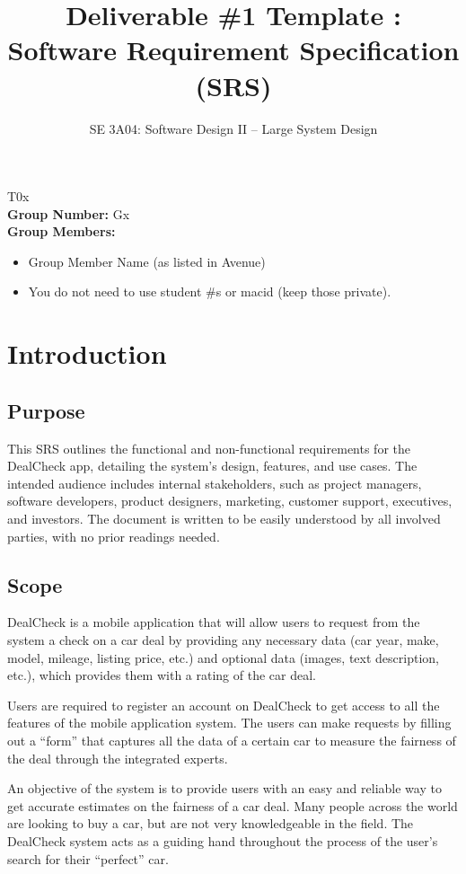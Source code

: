 \documentclass[]{article}
\title{Deliverable \#1 Template : Software Requirement Specification (SRS)}
\author{SE 3A04: Software Design II -- Large System Design}
\date{}
\begin{document}
\maketitle	
{} T0x\\
{\bf Group Number:} Gx \\
{\bf Group Members:} 
\begin{itemize}
    \item Group Member Name (as listed in Avenue)
    \item You do not need to use student \#s or macid (keep those private).
\end{itemize}

\newpage
\section{Introduction}
\label{sec:introduction}

\subsection{Purpose}
\label{sub:purpose}
This SRS outlines the functional and non-functional requirements for the DealCheck app, detailing the system's design, features, and use cases. The intended audience includes internal stakeholders, such as project managers, software developers, product designers, marketing, customer support, executives, and investors. The document is written to be easily understood by all involved parties, with no prior readings needed.

\subsection{Scope}
\label{sub:scope}
DealCheck is a mobile application that will allow users to request from the system a check on a car deal by providing any necessary data (car year, make, model, mileage, listing price, etc.) and optional data (images, text description, etc.), which provides them with a rating of the car deal. 

Users are required to register an account on DealCheck to get access to all the features of the mobile application system. The users can make requests by filling out a “form” that captures all the data of a certain car to measure the fairness of the deal through the integrated experts.

An objective of the system is to provide users with an easy and reliable way to get accurate estimates on the fairness of a car deal. Many people across the world are looking to buy a car, but are not very knowledgeable in the field. The DealCheck system acts as a guiding hand throughout the process of the user's search for their “perfect” car.
\end{document}
